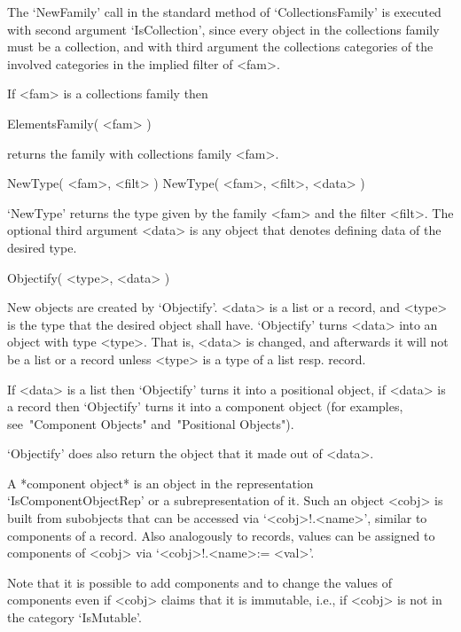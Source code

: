 The `NewFamily' call in the standard method of `CollectionsFamily'
is executed with second argument `IsCollection',
since every object in the collections family must be a collection,
and with third argument the collections categories of the involved
categories in the implied filter of <fam>.

If <fam> is a collections family then

\>ElementsFamily( <fam> )

returns the family with collections family <fam>.



\>NewType( <fam>, <filt> )
\)NewType( <fam>, <filt>, <data> )

`NewType' returns the type given by the family <fam>
and the filter <filt>.
The optional third argument <data> is any object that denotes defining
data of the desired type.



\>Objectify( <type>, <data> )

New objects are created by `Objectify'.
<data> is a list or a record, and <type> is the type that the desired
object shall have.
`Objectify' turns <data> into an object with type <type>.
That is, <data> is changed, and afterwards it will not be a list or a
record unless <type> is a type of a list resp. record.

If <data> is a list then `Objectify' turns it into a positional object,
if <data> is a record then `Objectify' turns it into a component object
(for examples, see~"Component Objects" and~"Positional Objects").

`Objectify' does also return the object that it made out of <data>.


A *component object* is an object in the representation
`IsComponentObjectRep' or a subrepresentation of it.
Such an object <cobj> is built from subobjects that can be accessed via
`<cobj>!.<name>', similar to components of a record.
Also analogously to records, values can be assigned to components of
<cobj> via `<cobj>!.<name>:= <val>'.

Note that it is possible to add components and to change the values of
components even if <cobj> claims that it is immutable, i.e., if <cobj>
is not in the category `IsMutable'.

